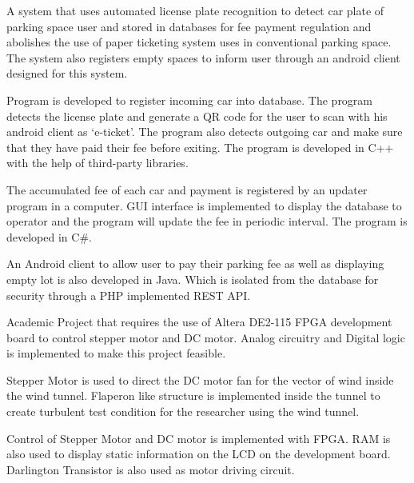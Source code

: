 \documentclass[letterpaper]{deedy-resume} %
\begin{document}
\begin{minipage}[t]{0.33\textwidth}
\end{minipage}
\hfill
\begin{minipage}[t]{0.66\textwidth}

\vspace{\topsep}
\begin{tightitemize}
\item A system that uses automated license plate recognition to detect car plate of parking space user and stored
in databases for fee payment regulation and abolishes the use of paper ticketing system uses in conventional parking space.
The system also registers empty spaces to inform user through an android client designed for this system.
\item Program is developed to register incoming car into database.
The program detects the license plate and generate a QR code for the user to scan with his android client as ‘e-ticket’.
The program also detects outgoing car and make sure that they have paid their fee before exiting.
The program is developed in C++ with the help of third-party libraries.
\item The accumulated fee of each car and payment is registered by an updater program in a computer.
GUI interface is implemented to display the database to operator and the program will update the fee in periodic interval. The program is developed in C\#.
\item An Android client to allow user to pay their parking fee as well as displaying empty lot is also developed in Java.
Which is isolated from the database for security through a PHP implemented REST API.
\end{tightitemize}
\sectionspace %

\vspace{\topsep}
\begin{tightitemize}
\item Academic Project that requires the use of Altera DE2-115 FPGA development board to control stepper motor and DC motor. Analog circuitry and Digital logic is implemented to make this project feasible.
\item Stepper Motor is used to direct the DC motor fan for the vector of wind inside the wind tunnel.
Flaperon like structure is implemented inside the tunnel to create turbulent test condition for the researcher using the wind tunnel.
\item Control of Stepper Motor and DC motor is implemented with FPGA. RAM is also used to display static information on the LCD on the development board. Darlington Transistor is also used as motor driving circuit.
\end{tightitemize}
\sectionspace %


\end{minipage}
\end{document}
